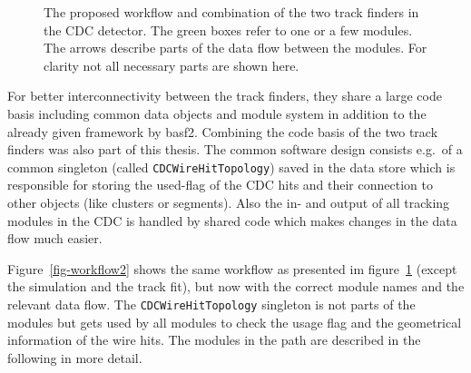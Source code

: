\begin{figure}
  \centering
 \caption[Proposed workflow in the CDC tracking]{The proposed workflow and combination of the two track finders in the CDC detector. The green boxes refer to one or a few modules. The arrows describe parts of the data flow between the modules. For clarity not all necessary parts are shown here.}
 \label{fig-workflow}
\end{figure}

For better interconnectivity between the track finders, they share a large code basis including common data objects and module system in addition to the already given framework by basf2. Combining the code basis of the two track finders was also part of this thesis. The common software design consists e.g.\ of a common singleton (called \texttt{CDCWireHitTopology}) saved in the data store which is responsible for storing the used-flag of the CDC hits and their connection to other objects (like clusters or segments). Also the in- and output of all tracking modules in the CDC is handled by shared code which makes changes in the data flow much easier.

Figure~\ref{fig-workflow2} shows the same workflow as presented im figure~\ref{fig-workflow} (except the simulation and the track fit), but now with the correct module names and the relevant data flow. The \texttt{CDCWireHitTopology} singleton is not parts of the modules but gets used by all modules to check the usage flag and the geometrical information of the wire hits. The modules in the path are described in the following in more detail.

